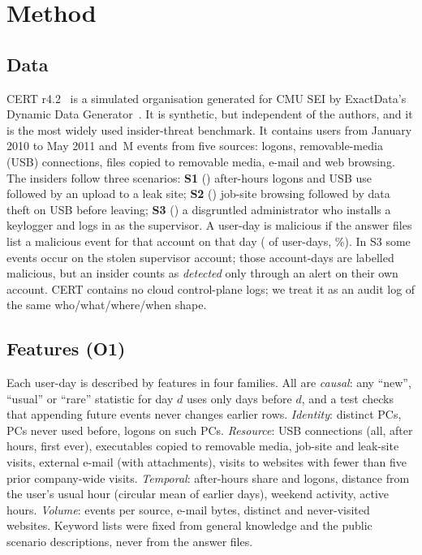 \documentclass[conference]{IEEEtran}
\begin{document}
\section{Method}
\subsection{Data}
CERT r4.2~\cite{lindauer2020cert} is a simulated organisation generated for CMU SEI by ExactData's
Dynamic Data Generator~\cite{glasser2013bridging}. It is synthetic, but independent of the
authors, and it is the most widely used insider-threat benchmark. It contains \NUsers{} users from
January 2010 to May 2011 and \NEvents{}\,M events from five sources: logons, removable-media
(USB) connections, files copied to removable media, e-mail and web browsing. The \NInsiders{}
insiders follow three scenarios: \textbf{S1} (\NInsSOne{}) after-hours logons and USB use followed by
an upload to a leak site; \textbf{S2} (\NInsSTwo{}) job-site browsing followed by data theft on USB
before leaving; \textbf{S3} (\NInsSThree{}) a disgruntled administrator who installs a keylogger and
logs in as the supervisor. A user-day is malicious if the answer files list a malicious event for
that account on that day (\NMalDays{} of \NUserDays{} user-days, \PosRate\%). In S3 some events
occur on the stolen supervisor account; those account-days are labelled malicious, but an insider
counts as \emph{detected} only through an alert on their own account. CERT contains no cloud
control-plane logs; we treat it as an audit log of the same who/what/where/when shape.

\subsection{Features (O1)}
Each user-day is described by \NFeatures{} features in four families. All are \emph{causal}: any
``new'', ``usual'' or ``rare'' statistic for day $d$ uses only days before $d$, and a test checks
that appending future events never changes earlier rows.
\emph{Identity}: distinct PCs, PCs never used before, logons on such PCs.
\emph{Resource}: USB connections (all, after hours, first ever), executables copied to removable
media, job-site and leak-site visits, external e-mail (with attachments), visits to websites with
fewer than five prior company-wide visits.
\emph{Temporal}: after-hours share and logons, distance from the user's usual hour (circular mean of
earlier days), weekend activity, active hours.
\emph{Volume}: events per source, e-mail bytes, distinct and never-visited websites.
Keyword lists were fixed from general knowledge and the public scenario descriptions, never from
the answer files.
\end{document}
